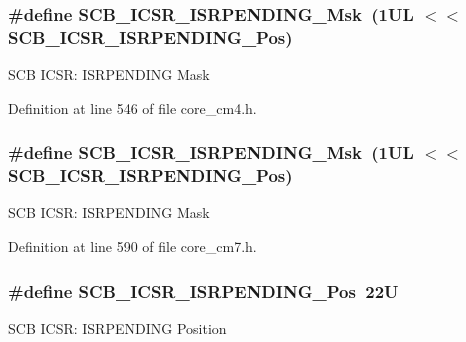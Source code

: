 \subsubsection[{\texorpdfstring{S\+C\+B\+\_\+\+I\+C\+S\+R\+\_\+\+I\+S\+R\+P\+E\+N\+D\+I\+N\+G\+\_\+\+Msk}{SCB_ICSR_ISRPENDING_Msk}}]{\setlength{\rightskip}{0pt plus 5cm}\#define S\+C\+B\+\_\+\+I\+C\+S\+R\+\_\+\+I\+S\+R\+P\+E\+N\+D\+I\+N\+G\+\_\+\+Msk~(1\+U\+L $<$$<$ S\+C\+B\+\_\+\+I\+C\+S\+R\+\_\+\+I\+S\+R\+P\+E\+N\+D\+I\+N\+G\+\_\+\+Pos)}\hypertarget{group___c_m_s_i_s___s_c_b_ga056d74fd538e5d36d3be1f28d399c877}{}\label{group___c_m_s_i_s___s_c_b_ga056d74fd538e5d36d3be1f28d399c877}
S\+CB I\+C\+SR\+: I\+S\+R\+P\+E\+N\+D\+I\+NG Mask 

Definition at line 546 of file core\+\_\+cm4.\+h.

\subsubsection[{\texorpdfstring{S\+C\+B\+\_\+\+I\+C\+S\+R\+\_\+\+I\+S\+R\+P\+E\+N\+D\+I\+N\+G\+\_\+\+Msk}{SCB_ICSR_ISRPENDING_Msk}}]{\setlength{\rightskip}{0pt plus 5cm}\#define S\+C\+B\+\_\+\+I\+C\+S\+R\+\_\+\+I\+S\+R\+P\+E\+N\+D\+I\+N\+G\+\_\+\+Msk~(1\+U\+L $<$$<$ S\+C\+B\+\_\+\+I\+C\+S\+R\+\_\+\+I\+S\+R\+P\+E\+N\+D\+I\+N\+G\+\_\+\+Pos)}\hypertarget{group___c_m_s_i_s___s_c_b_ga056d74fd538e5d36d3be1f28d399c877}{}\label{group___c_m_s_i_s___s_c_b_ga056d74fd538e5d36d3be1f28d399c877}
S\+CB I\+C\+SR\+: I\+S\+R\+P\+E\+N\+D\+I\+NG Mask 

Definition at line 590 of file core\+\_\+cm7.\+h.

\subsubsection[{\texorpdfstring{S\+C\+B\+\_\+\+I\+C\+S\+R\+\_\+\+I\+S\+R\+P\+E\+N\+D\+I\+N\+G\+\_\+\+Pos}{SCB_ICSR_ISRPENDING_Pos}}]{\setlength{\rightskip}{0pt plus 5cm}\#define S\+C\+B\+\_\+\+I\+C\+S\+R\+\_\+\+I\+S\+R\+P\+E\+N\+D\+I\+N\+G\+\_\+\+Pos~22U}\hypertarget{group___c_m_s_i_s___s_c_b_ga10749d92b9b744094b845c2eb46d4319}{}\label{group___c_m_s_i_s___s_c_b_ga10749d92b9b744094b845c2eb46d4319}
S\+CB I\+C\+SR\+: I\+S\+R\+P\+E\+N\+D\+I\+NG Position 

